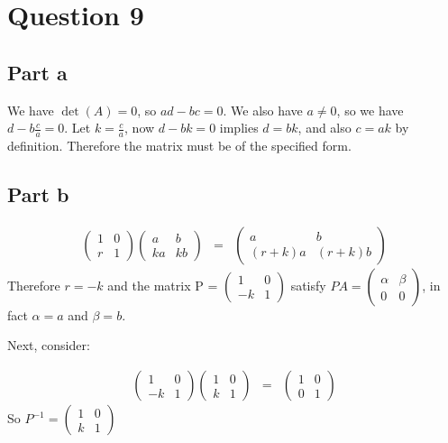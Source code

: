 \section*{Question 9}
\subsection*{Part a}
We have $ \det(A) = 0 $, so $ ad - bc = 0 $. We also have $ a \ne 0 $, so we have $ d - b\frac{c}{a} = 0 $.
Let $ k = \frac{c}{a} $, now $ d - bk = 0 $ implies $ d = bk $, and also $ c = ak $ by definition. Therefore the matrix must be of the specified form.

\subsection*{Part b}
\begin{eqnarray*}
  \left(\begin{array}{cc}
    1 & 0 \\
    r & 1
  \end{array}\right)\left(\begin{array}{cc}
    a & b \\
    ka & kb
  \end{array}\right) &=& 
  \left(\begin{array}{cc}
    a & b \\
    (r+k)a & (r+k)b 
  \end{array}\right)
\end{eqnarray*}
Therefore $ r = -k $ and the matrix P = $ \left(\begin{array}{cc}
    1 & 0 \\
    -k & 1
  \end{array}\right) $ satisfy $ PA = \left(\begin{array}{cc}
    \alpha & \beta \\
    0 & 0
  \end{array}\right) $, in fact $ \alpha = a $ and $ \beta = b $.

Next, consider:

\begin{eqnarray*}
  \left(\begin{array}{cc}
    1 & 0 \\
    -k & 1
  \end{array}\right)\left(\begin{array}{cc}
    1 & 0 \\
    k & 1
  \end{array}\right) &=& 
  \left(\begin{array}{cc}
    1 & 0 \\
    0 & 1
  \end{array}\right)
\end{eqnarray*}
So $ P^{-1} = \left(\begin{array}{cc}
    1 & 0 \\
    k & 1
  \end{array}\right) $

